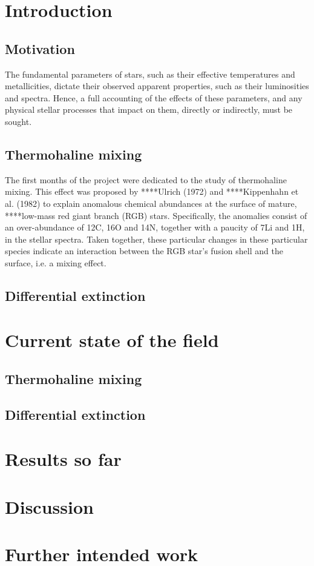 \documentclass{mnras}
\begin{document}
\section{Introduction}
\subsection{Motivation}
The fundamental parameters of stars, such as their effective temperatures and metallicities, dictate their observed apparent properties, such as their luminosities and spectra. Hence, a full accounting of the effects of these parameters, and any physical stellar processes that impact on them, directly or indirectly, must be sought.

\subsection{Thermohaline mixing}
The first months of the project were dedicated to the study of thermohaline mixing. This effect was proposed by ****Ulrich (1972) and ****Kippenhahn et al. (1982) to explain anomalous chemical abundances at the surface of mature, ****low-mass red giant branch (RGB) stars. Specifically, the anomalies consist of an over-abundance of 12C, 16O and 14N, together with a paucity of 7Li and 1H, in the stellar spectra. Taken together, these particular changes in these particular species indicate an interaction between the RGB star's fusion shell and the surface, i.e. a mixing effect.

\subsection{Differential extinction}


\section{Current state of the field}
\subsection{Thermohaline mixing}

\subsection{Differential extinction}

\section{Results so far}

\section{Discussion}

\section{Further intended work}
\end{document}

